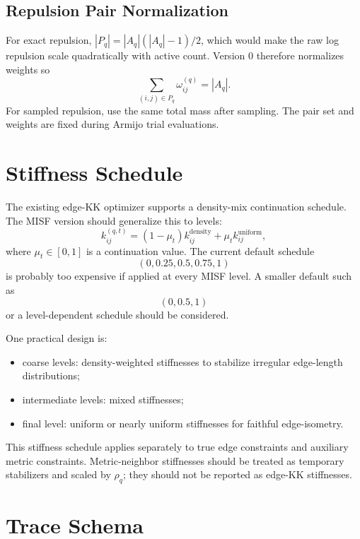 \documentclass[11pt]{article}
\begin{document}
\subsection{Repulsion Pair Normalization}

For exact repulsion, \(|P_q|=|A_q|(|A_q|-1)/2\), which would make the raw log
repulsion scale quadratically with active count. Version 0 therefore normalizes
weights so
\[
  \sum_{(i,j)\in P_q} \omega_{ij}^{(q)} = |A_q|.
\]
For sampled repulsion, use the same total mass after sampling. The pair set and
weights are fixed during Armijo trial evaluations.

\section{Stiffness Schedule}

The existing edge-KK optimizer supports a density-mix continuation schedule.
The MISF version should generalize this to levels:
\[
  k_{ij}^{(q,t)}
  =
  (1-\mu_t)k_{ij}^{\mathrm{density}}
  +
  \mu_t k_{ij}^{\mathrm{uniform}},
\]
where \(\mu_t\in[0,1]\) is a continuation value. The current default schedule
\[
  (0,0.25,0.5,0.75,1)
\]
is probably too expensive if applied at every MISF level. A smaller default
such as
\[
  (0,0.5,1)
\]
or a level-dependent schedule should be considered.

One practical design is:
\begin{itemize}[leftmargin=2em]
  \item coarse levels: density-weighted stiffnesses to stabilize irregular
  edge-length distributions;
  \item intermediate levels: mixed stiffnesses;
  \item final level: uniform or nearly uniform stiffnesses for faithful
  edge-isometry.
\end{itemize}

This stiffness schedule applies separately to true edge constraints and
auxiliary metric constraints. Metric-neighbor stiffnesses should be treated as
temporary stabilizers and scaled by \(\rho_q\); they should not be reported as
edge-KK stiffnesses.

\section{Trace Schema}
\end{document}
